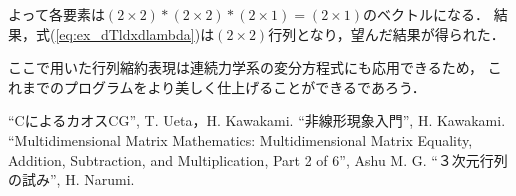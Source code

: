 \documentclass[a4paper,dvipdfmx]{jsarticle}
\begin{document}
よって各要素は$(2\times2)*(2\times2)*(2\times1)=(2\times1)$のベクトルになる．
結果，式(\ref{eq:ex_dTldxdlambda})は$(2\times2)$行列となり，望んだ結果が得られた．

ここで用いた行列縮約表現は連続力学系の変分方程式にも応用できるため，
これまでのプログラムをより美しく仕上げることができるであろう．


\begin{thebibliography}{3}
 ``CによるカオスCG'', T. Ueta，H. Kawakami.
 ``非線形現象入門'', H. Kawakami.
 ``Multidimensional Matrix Mathematics: Multidimensional Matrix Equality, Addition, Subtraction, and Multiplication, Part 2 of 6'', Ashu M. G.
 ``３次元行列の試み'', H. Narumi.
\end{thebibliography}    
\end{document}
